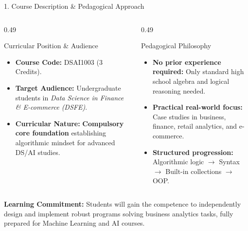 \documentclass[aspectratio=169, 10pt]{beamer}
\begin{document}
\begin{frame}{1. Course Description \& Pedagogical Approach}
  \begin{columns}[T]
    \begin{column}{0.49\textwidth}
      \begin{cbox}[primaryblue]{Curricular Position \& Audience}
        \small
        \begin{itemize}\setlength{\itemsep}{2pt}
          \item \textbf{Course Code:} DSAI1003 (3 Credits).
          \item \textbf{Target Audience:} Undergraduate students in \textit{Data Science in Finance \& E-commerce (DSFE)}.
          \item \textbf{Curricular Nature:} \textbf{Compulsory core foundation} establishing algorithmic mindset for advanced DS/AI studies.
        \end{itemize}
      \end{cbox}
    \end{column}
    \begin{column}{0.49\textwidth}
      \begin{cbox}[secondarygreen]{Pedagogical Philosophy}
        \small
        \begin{itemize}\setlength{\itemsep}{2pt}
          \item \textbf{No prior experience required:} Only standard high school algebra and logical reasoning needed.
          \item \textbf{Practical real-world focus:} Case studies in business, finance, retail analytics, and e-commerce.
          \item \textbf{Structured progression:} Algorithmic logic $\rightarrow$ Syntax $\rightarrow$ Built-in collections $\rightarrow$ OOP.
        \end{itemize}
      \end{cbox}
    \end{column}
  \end{columns}
  \vspace{0.12cm}
  \begin{tcolorbox}[colback=primaryblue!8, colframe=primaryblue!60, arc=3pt, left=8pt, right=8pt, top=3pt, bottom=3pt]
    \footnotesize
    \textbf{Learning Commitment:} Students will gain the competence to independently design and implement robust programs solving business analytics tasks, fully prepared for Machine Learning and AI courses.
  \end{tcolorbox}
\end{frame}
\end{document}
